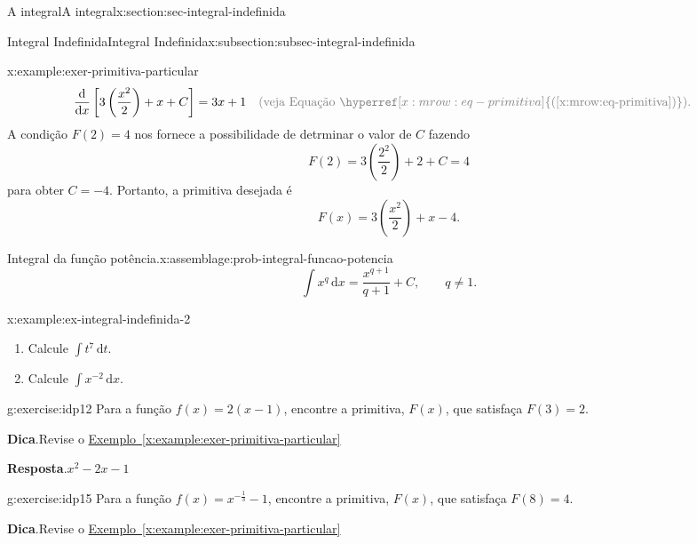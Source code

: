 \documentclass[oneside,10pt,]{article}
\newcommand{\blocktitlefont}{\relax}
\newcommand{\xreffont}{\relax}
\numberwithin{equation}{section}
\newcommand{\dd}{\mathrm{d}}
\newcommand{\integral}[2]{\displaystyle\int {#1}\,\dd {#2}}
\newcommand{\amp}{&}
\begin{document}
\begin{sectionptx}{A integral}{}{A integral}{}{}{x:section:sec-integral-indefinida}
\begin{subsectionptx}{Integral Indefinida}{}{Integral Indefinida}{}{}{x:subsection:subsec-integral-indefinida}
\begin{example}{}{x:example:exer-primitiva-particular}
\begin{align*}
\frac{\dd }{\dd x}\left[3\left(\frac{x^2}{2}\right) + x+ C\right]= 3x+1 \amp \quad \color{gray}{(\text{veja Equação} \,\,  \hyperref[x:mrow:eq-primitiva]{\text{({\xreffont\ref{x:mrow:eq-primitiva}})}})}\text{.}
\end{align*}
A condição \(F(2)=4\) nos fornece a possibilidade de detrminar o valor de \(C\) fazendo%
\begin{equation*}
F(2)=   3\left(\frac{2^2}{2}\right) + 2 + C = 4
\end{equation*}
para obter \(C=-4\). Portanto, a primitiva desejada é%
\begin{equation*}
F(x)= 3\left(\frac{x^2}{2}\right) + x - 4\text{.}
\end{equation*}
%
\end{example}
\begin{assemblage}{Integral da função potência.}{x:assemblage:prob-integral-funcao-potencia}%
%
\begin{equation*}
\integral{x^q}{x} = \frac{x^{q+1}}{q+1} + C, \qquad q\neq 1.
\end{equation*}
%
\end{assemblage}
\begin{example}{}{x:example:ex-integral-indefinida-2}%
\begin{enumerate}[font=\bfseries,label=(\alph*),ref=\alph*]
\item{}Calcule \(\integral{t^7}{t}\).%
 \item{}Calcule \(\integral{x^{-2}}{x}\).%
\end{enumerate}
%
\end{example}
\begin{inlineexercise}{}{g:exercise:idp12}%
Para a função \(f(x)=2(x-1)\), encontre a primitiva, \(F(x)\), que satisfaça \(F(3)=2\).%
\par\smallskip%
\noindent\textbf{\blocktitlefont Dica}.\hypertarget{g:hint:idp13}{}\quad{}Revise o \hyperref[x:example:exer-primitiva-particular]{Exemplo~{\xreffont\ref{x:example:exer-primitiva-particular}}}%
\par\smallskip%
\noindent\textbf{\blocktitlefont Resposta}.\hypertarget{g:answer:idp14}{}\quad{}\(x^2-2x-1\)%
\end{inlineexercise}
\begin{inlineexercise}{}{g:exercise:idp15}%
Para a função \(f(x)=x^{-\frac{1}{3}}-1\), encontre a primitiva, \(F(x)\), que satisfaça \(F(8)=4\).%
\par\smallskip%
\noindent\textbf{\blocktitlefont Dica}.\hypertarget{g:hint:idp16}{}\quad{}Revise o \hyperref[x:example:exer-primitiva-particular]{Exemplo~{\xreffont\ref{x:example:exer-primitiva-particular}}}%

\end{inlineexercise}
\end{subsectionptx}
\end{sectionptx}
\end{document}
